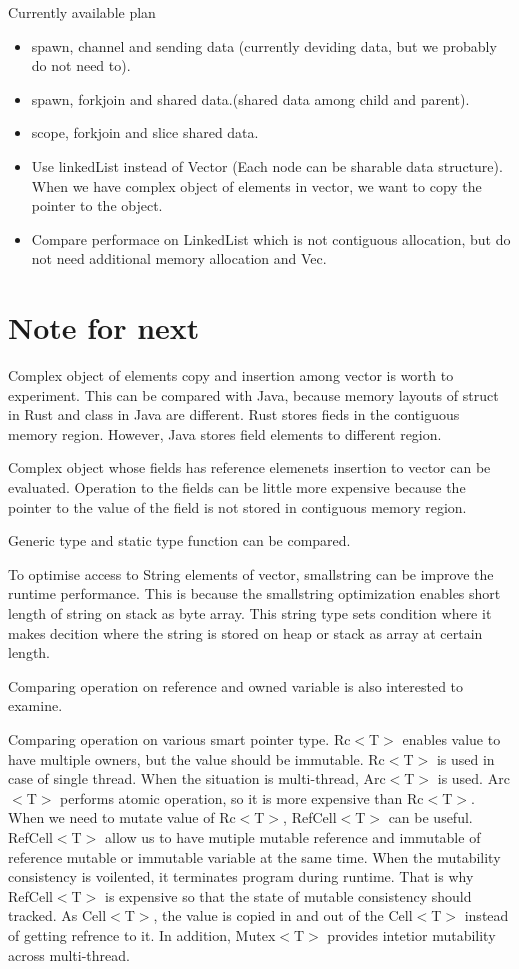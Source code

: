 Currently available plan
\begin{itemize}
    \item spawn, channel and sending data (currently deviding data, but we probably do not need to).
    \item spawn, forkjoin and shared data.(shared data among child and parent).
    \item scope, forkjoin and slice shared data.
    \item Use linkedList instead of Vector (Each node can be sharable data structure). When we have complex object of elements in vector, we want to copy the pointer to the object.
    \item Compare performace on LinkedList which is not contiguous allocation, but do not need additional memory allocation and Vec.
\end{itemize}



\section{Note for next}
\label{sec:history}
Complex object of elements copy and insertion among vector is worth to experiment. This can be compared with Java,
because memory layouts of struct in Rust and class in Java are different. Rust stores fieds in the contiguous memory region. 
However, Java stores field elements to different region.

Complex object whose fields has reference elemenets insertion to vector can be evaluated. Operation to the fields can be little 
more expensive because the pointer to the value of the field is not stored in contiguous memory region.

Generic type and static type function can be compared. 

To optimise access to String elements of vector, smallstring can be improve the runtime performance. 
This is because the smallstring optimization enables short length of string on stack as byte array. 
This string type sets condition where it makes decition where the string is stored on heap or stack as array at certain length.

Comparing operation on reference and owned variable is also interested to examine.

Comparing operation on various smart pointer type. 
Rc$<$T$>$ enables value to have multiple owners, but the value should be immutable. Rc$<$T$>$ is used in case of single thread. 
When the situation is multi-thread, Arc$<$T$>$ is used. Arc$<$T$>$ performs atomic operation, so it is more expensive than Rc$<$T$>$. 
When we need to mutate value of Rc$<$T$>$, RefCell$<$T$>$ can be useful. RefCell$<$T$>$ allow us to have mutiple mutable reference and immutable
of reference mutable or immutable variable at the same time. When the mutability consistency is voilented, it terminates program during runtime. 
That is why RefCell$<$T$>$ is expensive so that the state of mutable consistency should tracked. 
As Cell$<$T$>$, the value is copied in and out of the Cell$<$T$>$ instead of getting refrence to it. 
In addition, Mutex$<$T$>$ provides intetior mutability across multi-thread.

